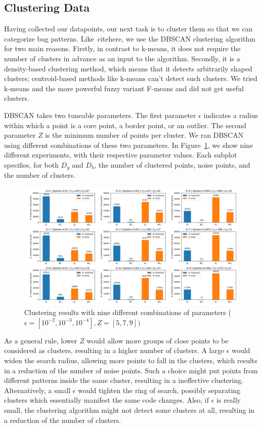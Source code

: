 \subsection{\label{sec:clustering_data}Clustering Data}

Having collected our datapoints, our next task is to cluster them so that we can categorize bug patterns. Like~citehere, we use the DBSCAN clustering algorithm for two main reasons. Firstly, in contrast to k-means, it does not require the number of clusters in advance as an input to the algorithm. Secondly, it is a density-based clustering method, which means that it detects arbitrarily shaped clusters; centroid-based methods like k-means can't detect such clusters. We tried k-means and the more powerful fuzzy variant F-means and did not get useful clusters.

DBSCAN takes two tuneable parameters. The first parameter $\epsilon$ indicates a radius within which a point is a core point, a border point, or an outlier. The second parameter $Z$ is the minimum number of points per cluster. We ran DBSCAN using different combinations of these two parameters. In Figure~\ref{fig:clustering}, we show nine different experiments, with their respective parameter values. Each subplot specifies, for both $D_g$ and $D_b$, the number of clustered points, noise points, and the number of clusters.

\begin{figure}[h]
\centering
\includegraphics[width=1\textwidth]{figs/clusters.png}
\caption{\label{fig:clustering} Clustering results with nine different combinations of parameters ($\epsilon=[10^{-2}, 10^{-3}, 10^{-4}], Z=[5,7,9])$}
\end{figure}

As a general rule, lower $Z$ would allow more groups of close points to be considered as clusters, resulting in a higher number of clusters. A large $\epsilon$ would widen the search radius, allowing more points to fall in the clusters, which results in a reduction of the number of noise points. Such a choice might put points from different patterns inside the same cluster, resulting in a ineffective clustering. Alternatively, a small $\epsilon$ would tighten the ring of search, possibly separating clusters which essentially manifest the same code changes. Also, if $\epsilon$ is really small, the clustering algorithm might not detect some clusters at all, resulting in a reduction of the number of clusters. 

